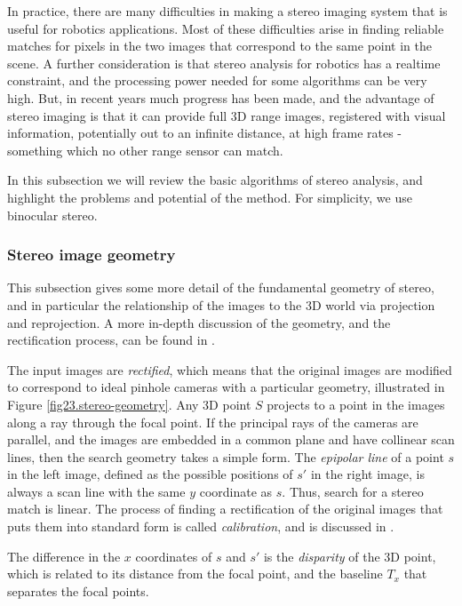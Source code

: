 \documentclass[twocolumn,oneside]{book}
\begin{document}
In practice, there are many difficulties in making a stereo imaging
system that is useful for robotics applications.  Most of these
difficulties arise in finding reliable matches for pixels in the two
images that correspond to the same point in the scene.  A further
consideration is that stereo analysis for robotics has a realtime
constraint, and the processing power needed for some algorithms can be
very high.  But, in recent years much progress has been made, and the
advantage of stereo imaging is that it can provide full 3D range
images, registered with visual information, potentially out to an
infinite distance, at high frame rates - something which no other
range sensor can match.

In this subsection we will review the basic algorithms of stereo
analysis, and highlight the problems and potential of the method.
For simplicity, we use binocular stereo.


\subsubsection{Stereo image geometry}

This subsection gives some more detail of the fundamental geometry of
stereo, and in particular the relationship of the images to the 3D
world via projection and reprojection.  A more in-depth discussion of
the geometry, and the rectification process, can be found in \cite{hartley}.


The input images are {\em rectified}, which means that the original
images are modified to correspond to ideal pinhole cameras with a
particular geometry, illustrated in Figure \ref{fig23.stereo-geometry}.
Any 3D point $S$ projects to a point in the images along a ray through
the focal point.  If the principal rays of the cameras are parallel,
and the images are embedded in a common plane and have collinear scan
lines, then the search geometry takes a simple form.  The {\em
epipolar line} of a point $s$ in the left image, defined as the
possible positions of $s'$ in the right image, is always a scan line
with the same $y$ coordinate as $s$.  Thus, search for a stereo match
is linear.  The process of finding a rectification of the original
images that puts them into standard form is called {\em calibration},
and is discussed in \cite{hartley}.

The difference in the $x$ coordinates of $s$ and $s'$ is the {\em
disparity} of the 3D point, which is related to its distance from the
focal point, and the baseline $T_x$ that separates the focal points.
\end{document}
